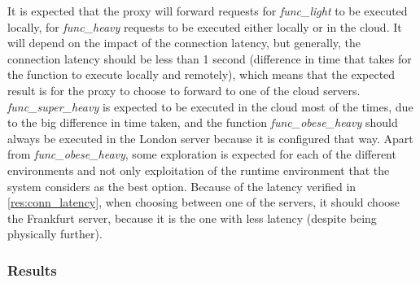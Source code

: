 \documentclass[conference]{IEEEtran}
\begin{document}
It is expected that the proxy will forward requests for \textit{func\_light} to be
executed locally, for \textit{func\_heavy} requests to be executed either locally
or in the cloud. It will depend on the impact of the connection latency, but
generally, the connection latency should be less than 1 second (difference in time
that takes for the function to execute locally and remotely), which means that the expected result is for the proxy to choose to forward to one of the cloud servers.
\textit{func\_super\_heavy} is expected to be executed in the cloud most of the
times, due to the big difference in time taken, and the function
\textit{func\_obese\_heavy} should always be executed in the London server because
it is configured that way. Apart from \textit{func\_obese\_heavy}, some
exploration is expected for each of the different environments and not only
exploitation of the runtime environment that the system considers as the best
option. Because of the latency verified in \ref{res:conn_latency}, when choosing
between one of the servers, it should choose the Frankfurt server, because it is
the one with less latency (despite being physically further).

\subsubsection{Results}
\end{document}
